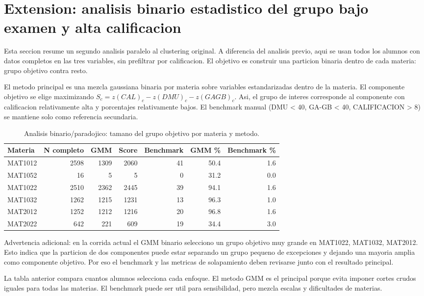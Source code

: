 \section{Extension: analisis binario estadistico del grupo bajo examen y alta calificacion}

Esta seccion resume un segundo analisis paralelo al clustering original. A diferencia del analisis previo, aqui se usan todos los alumnos con datos completos en las tres variables, sin prefiltrar por calificacion. El objetivo es construir una particion binaria dentro de cada materia: grupo objetivo contra resto.

El metodo principal es una mezcla gaussiana binaria por materia sobre variables estandarizadas dentro de la materia. El componente objetivo se elige maximizando $S_c=z(CAL)_c-z(DMU)_c-z(GAGB)_c$. Asi, el grupo de interes corresponde al componente con calificacion relativamente alta y porcentajes relativamente bajos. El benchmark manual (DMU < 40, GA-GB < 40, CALIFICACION > 8) se mantiene solo como referencia secundaria.

\begin{table}[H]
\centering
\small
\caption{Analisis binario/paradojico: tamano del grupo objetivo por materia y metodo.}
\begin{tabular}{lrrrrrr}
\toprule
Materia & N completo & GMM & Score & Benchmark & GMM \% & Benchmark \% \\
\midrule
MAT1012 & 2598 & 1309 & 2060 & 41 & 50.4 & 1.6 \\
MAT1052 & 16 & 5 & 5 & 0 & 31.2 & 0.0 \\
MAT1022 & 2510 & 2362 & 2445 & 39 & 94.1 & 1.6 \\
MAT1032 & 1262 & 1215 & 1231 & 13 & 96.3 & 1.0 \\
MAT2012 & 1252 & 1212 & 1216 & 20 & 96.8 & 1.6 \\
MAT2022 & 642 & 221 & 609 & 19 & 34.4 & 3.0 \\
\bottomrule
\end{tabular}
\end{table}

Advertencia adicional: en la corrida actual el GMM binario selecciono un grupo objetivo muy grande en MAT1022, MAT1032, MAT2012. Esto indica que la particion de dos componentes puede estar separando un grupo pequeno de excepciones y dejando una mayoria amplia como componente objetivo. Por eso el benchmark y las metricas de solapamiento deben revisarse junto con el resultado principal.

La tabla anterior compara cuantos alumnos selecciona cada enfoque. El metodo GMM es el principal porque evita imponer cortes crudos iguales para todas las materias. El benchmark puede ser util para sensibilidad, pero mezcla escalas y dificultades de materias.

